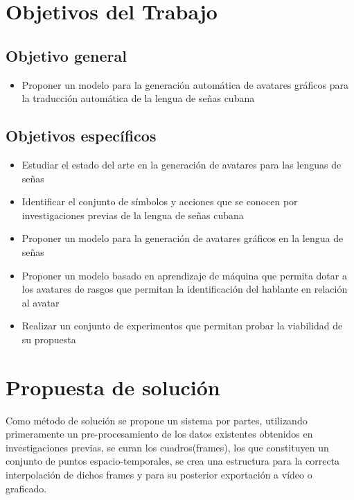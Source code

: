 \section{Objetivos del Trabajo}

 
\subsection{Objetivo general}
\begin{itemize}
\item Proponer un modelo para la generación automática de avatares gráficos para la traducción
automática de la lengua de señas cubana

\end{itemize}

\subsection{Objetivos específicos}
\begin{itemize}
\item Estudiar el estado del arte en la generación de avatares para las lenguas de señas
\item Identificar el conjunto de símbolos y acciones que se conocen por investigaciones previas de la lengua de señas cubana
\item Proponer un modelo para la generación de avatares gráficos en la lengua de 
señas
\item Proponer un modelo basado en aprendizaje de máquina que permita dotar a los avatares de rasgos que permitan la identificación del hablante en relación al avatar
\item Realizar un conjunto de experimentos que permitan probar la viabilidad de su propuesta
\end{itemize}

\section{Propuesta de solución}
Como método de solución se propone un sistema por partes, utilizando primeramente un pre-procesamiento de los datos existentes obtenidos en investigaciones previas, se curan los cuadros(frames), los que constituyen un conjunto de puntos espacio-temporales, se crea una estructura para la correcta interpolación de dichos frames y para su posterior exportación a vídeo o graficado.  

